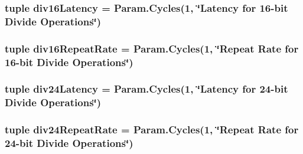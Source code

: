 \label{classInOrderCPU_1_1InOrderCPU_a17da7064bc5c518791f0c891eff05fda}
\hypertarget{classInOrderCPU_1_1InOrderCPU_a060046a1d58d586e6d65b6dfb868ef96}{
\subsubsection[{div16Latency}]{\setlength{\rightskip}{0pt plus 5cm}tuple {\bf div16Latency} = Param.Cycles(1, \char`\"{}Latency for 16-\/bit Divide Operations\char`\"{})}}
\label{classInOrderCPU_1_1InOrderCPU_a060046a1d58d586e6d65b6dfb868ef96}
\hypertarget{classInOrderCPU_1_1InOrderCPU_a2a96d4b0aa6b3dfc9a5fcd7f830a51f9}{
\subsubsection[{div16RepeatRate}]{\setlength{\rightskip}{0pt plus 5cm}tuple {\bf div16RepeatRate} = Param.Cycles(1, \char`\"{}Repeat Rate for 16-\/bit Divide Operations\char`\"{})}}
\label{classInOrderCPU_1_1InOrderCPU_a2a96d4b0aa6b3dfc9a5fcd7f830a51f9}
\hypertarget{classInOrderCPU_1_1InOrderCPU_a54b0720449ef5f17f05d541a895c1017}{
\subsubsection[{div24Latency}]{\setlength{\rightskip}{0pt plus 5cm}tuple {\bf div24Latency} = Param.Cycles(1, \char`\"{}Latency for 24-\/bit Divide Operations\char`\"{})}}
\label{classInOrderCPU_1_1InOrderCPU_a54b0720449ef5f17f05d541a895c1017}
\hypertarget{classInOrderCPU_1_1InOrderCPU_ab804bac6417fc4bbdbf4cee8466a689c}{
\subsubsection[{div24RepeatRate}]{\setlength{\rightskip}{0pt plus 5cm}tuple {\bf div24RepeatRate} = Param.Cycles(1, \char`\"{}Repeat Rate for 24-\/bit Divide Operations\char`\"{})}}
